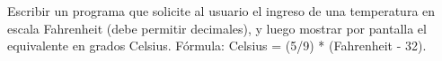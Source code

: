 ﻿
Escribir un programa que solicite al usuario el ingreso de una temperatura en escala Fahrenheit (debe permitir decimales), y luego mostrar por pantalla el equivalente en grados Celsius. Fórmula: Celsius = (5/9) * (Fahrenheit - 32).



\volverindice
\newpage
